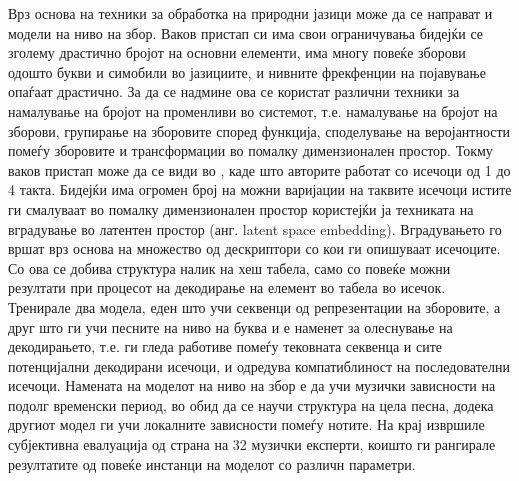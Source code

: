 Врз основа на техники за обработка на природни јазици може да се направат и модели на ниво на збор. Ваков пристап си има свои ограничувања бидејќи се зголему драстично бројот на основни елементи, има многу повеќе зборови одошто букви и симобили во јазициите, и нивните фрекфенции на појавување опаѓаат драстично. За да се надмине ова се користат различни техники за намалување на бројот на променливи во системот, т.е. намалување на бројот на зборови, групирање на зборовите според функција, споделување на веројантности помеѓу зборовите и трансформации во помалку димензионален простор. Токму ваков пристап може да се види во \cite{Bretan2016}, каде што авторите работат со исечоци од 1 до 4 такта. Бидејќи има огромен број на можни варијации на таквите исечоци истите ги смалуваат во помалку димензионален простор користејќи ја техниката на вградување во латентен простор (анг. latent space embedding). Вградувањето го вршат врз основа на множество од дескриптори со кои ги опишуваат исечоците. Со ова се добива структура налик на хеш табела, само со повеќе можни резултати при процесот на декодирање на елемент во табела во исечок. Тренирале два модела, еден што учи секвенци од репрезентации на зборовите, а друг што ги учи песните на ниво на буква и е наменет за олеснување на декодирањето, т.е. ги гледа работиве помеѓу тековната секвенца и сите потенцијални декодирани исечоци, и одредува компатиблиност на последователни исечоци. Намената на моделот на ниво на збор е да учи музички зависности на подолг временски период, во обид да се научи структура на цела песна, додека другиот модел ги учи локалните зависности помеѓу нотите. На крај извршиле субјективна евалуација од страна на 32 музички експерти, коишто ги рангирале резултатите од повеќе инстанци на моделот со различн параметри.

